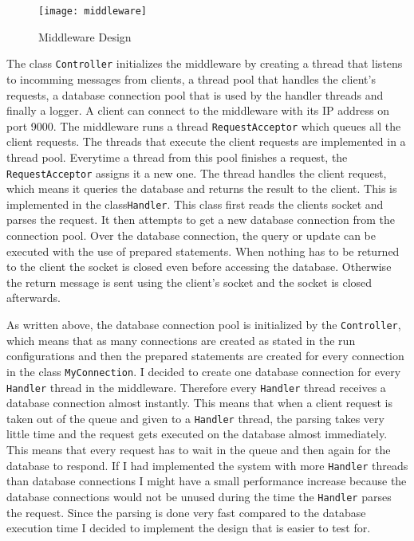 \documentclass[
10pt, %
a4paper, %
oneside, %
headinclude,footinclude, %
BCOR5mm, %
]{scrartcl}
\begin{document}
\begin{figure}[H]
\centering
\texttt{[image: middleware]}
\caption{Middleware Design}
\label{fig:middleware}
\end{figure}

The class \texttt{Controller} initializes the middleware by creating a thread that listens to incomming messages from clients, a thread pool that handles the client's requests, a database connection pool that is used by the handler threads and finally a logger. 
A client can connect to the middleware with its IP address on port 9000. The middleware runs a thread \texttt{RequestAcceptor} which queues all the client requests. 
The threads that execute the client requests are implemented in a thread pool. Everytime a thread from this pool finishes a request, the \texttt{RequestAcceptor} assigns it a new one.
The thread handles the client request, which means it queries the database and returns the result to the client. This is implemented in the class\texttt{Handler}. This class first reads the clients socket and parses the request. It then attempts to get a new database connection from the connection pool. Over the database connection, the query or update can be executed with the use of prepared statements. When nothing has to be returned to the client the socket is closed even before accessing the database. Otherwise the return message is sent using the client's socket and the socket is closed afterwards.


As written above, the database connection pool is initialized by the \texttt{Controller}, which means that as many connections are created as stated in the run configurations and then the prepared statements are created for every connection in the class \texttt{MyConnection}. I decided to create one database connection for every \texttt{Handler} thread in the middleware. Therefore every \texttt{Handler} thread receives a database connection almost instantly. This means that when a client request is taken out of the queue and given to a \texttt{Handler} thread, the parsing takes very little time and the request gets executed on the database almost immediately. This means that every request has to wait in the queue and then again for the database to respond. If I had implemented the system with more \texttt{Handler} threads than database connections I might have a small performance increase because the database connections would not be unused during the time the \texttt{Handler} parses the request. Since the parsing is done very fast compared to the database execution time I decided to implement the design that is easier to test for.
\end{document}
